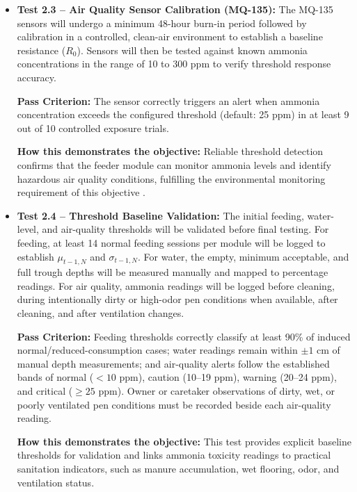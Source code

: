 \begin{itemize}
  \item \textbf{Test 2.3 -- Air Quality Sensor Calibration (MQ-135):} The MQ-135 sensors will undergo a minimum 48-hour burn-in period followed by calibration in a controlled, clean-air environment to establish a baseline resistance ($R_0$). Sensors will then be tested against known ammonia concentrations in the range of 10 to 300 ppm to verify threshold response accuracy.

    \textbf{Pass Criterion:} The sensor correctly triggers an alert when ammonia concentration exceeds the configured threshold (default: 25 ppm) in at least 9 out of 10 controlled exposure trials.

    \textbf{How this demonstrates the objective:} Reliable threshold detection confirms that the feeder module can monitor ammonia levels and identify hazardous air quality conditions, fulfilling the environmental monitoring requirement of this objective \cite{sadeghi2023improving,adeoye2025animalia,yamsakul2025machine}.

  \item \textbf{Test 2.4 -- Threshold Baseline Validation:} The initial feeding, water-level, and air-quality thresholds will be validated before final testing. For feeding, at least 14 normal feeding sessions per module will be logged to establish $\mu_{t-1,N}$ and $\sigma_{t-1,N}$. For water, the empty, minimum acceptable, and full trough depths will be measured manually and mapped to percentage readings. For air quality, ammonia readings will be logged before cleaning, during intentionally dirty or high-odor pen conditions when available, after cleaning, and after ventilation changes.

    \textbf{Pass Criterion:} Feeding thresholds correctly classify at least 90\% of induced normal/reduced-consumption cases; water readings remain within $\pm 1$ cm of manual depth measurements; and air-quality alerts follow the established bands of normal ($<10$ ppm), caution (10--19 ppm), warning (20--24 ppm), and critical ($\geq25$ ppm). Owner or caretaker observations of dirty, wet, or poorly ventilated pen conditions must be recorded beside each air-quality reading.

    \textbf{How this demonstrates the objective:} This test provides explicit baseline thresholds for validation and links ammonia toxicity readings to practical sanitation indicators, such as manure accumulation, wet flooring, odor, and ventilation status.
\end{itemize}

